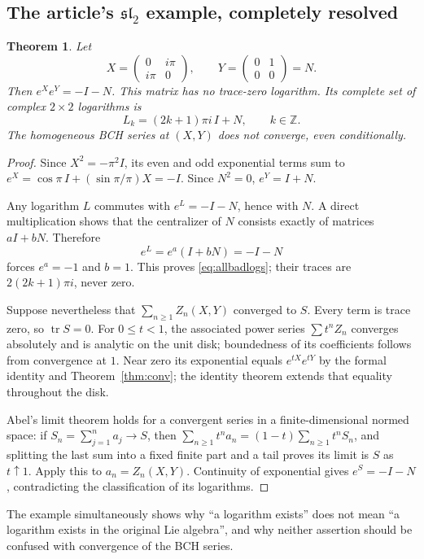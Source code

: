 \documentclass[11pt]{article}
\newtheorem{theorem}{Theorem}[section]
\theoremstyle{definition}
\theoremstyle{remark}
\newcommand{\tr}{\operatorname{tr}}
\numberwithin{equation}{section}
\begin{document}
\subsection{The article's \texorpdfstring{$\mathfrak{sl}_2$}{sl2} example, completely resolved}
\begin{theorem}\label{thm:divergence}
Let
\begin{equation}\label{eq:badmatrices}
 X=\begin{pmatrix}0&i\pi\\i\pi&0\end{pmatrix},\qquad
 Y=\begin{pmatrix}0&1\\0&0\end{pmatrix}=N.
\end{equation}
Then $e^Xe^Y=-I-N$. This matrix has no trace-zero logarithm. Its complete set of complex $2\times2$ logarithms is
\begin{equation}\label{eq:allbadlogs}
 L_k=(2k+1)\pi i\,I+N,\qquad k\in\mathbb Z.
\end{equation}
The homogeneous BCH series at $(X,Y)$ does not converge, even conditionally.
\end{theorem}
\begin{proof}
Since $X^2=-\pi^2I$, its even and odd exponential terms sum to
$e^X=\cos\pi\,I+(\sin\pi/\pi)X=-I$. Since $N^2=0$, $e^Y=I+N$.

Any logarithm $L$ commutes with $e^L=-I-N$, hence with $N$. A direct multiplication shows that the centralizer of $N$ consists exactly of matrices $aI+bN$. Therefore
\[
 e^L=e^a(I+bN)=-I-N
\]
forces $e^a=-1$ and $b=1$. This proves \eqref{eq:allbadlogs}; their traces are $2(2k+1)\pi i$, never zero.

Suppose nevertheless that $\sum_{n\geq1}Z_n(X,Y)$ converged to $S$. Every term is trace zero, so $\tr S=0$. For $0\leq t<1$, the associated power series $\sum t^nZ_n$ converges absolutely and is analytic on the unit disk; boundedness of its coefficients follows from convergence at $1$. Near zero its exponential equals $e^{tX}e^{tY}$ by the formal identity and Theorem~\ref{thm:conv}; the identity theorem extends that equality throughout the disk.

Abel's limit theorem holds for a convergent series in a finite-dimensional normed space: if $S_n=\sum_{j=1}^na_j\to S$, then
$\sum_{n\geq1}t^na_n=(1-t)\sum_{n\geq1}t^nS_n$, and splitting the last sum into a fixed finite part and a tail proves its limit is $S$ as $t\uparrow1$. Apply this to $a_n=Z_n(X,Y)$. Continuity of exponential gives $e^S=-I-N$, contradicting the classification of its logarithms.
\end{proof}
The example simultaneously shows why ``a logarithm exists'' does not mean ``a logarithm exists in the original Lie algebra'', and why neither assertion should be confused with convergence of the BCH series.
\end{document}
